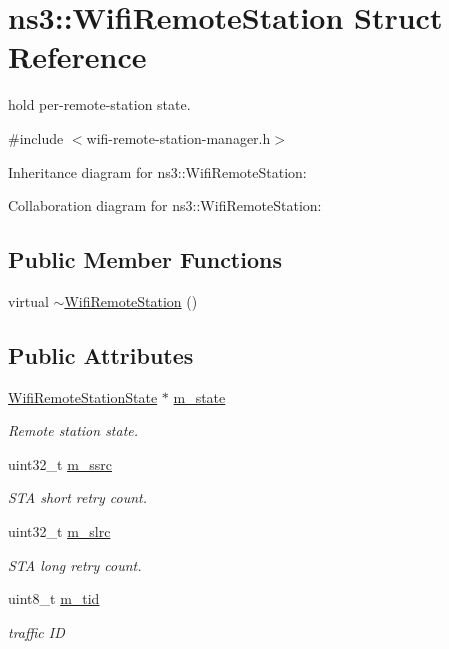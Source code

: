 \hypertarget{structns3_1_1WifiRemoteStation}{}\section{ns3\+:\+:Wifi\+Remote\+Station Struct Reference}
\label{structns3_1_1WifiRemoteStation}


hold per-\/remote-\/station state.  




{\ttfamily \#include $<$wifi-\/remote-\/station-\/manager.\+h$>$}



Inheritance diagram for ns3\+:\+:Wifi\+Remote\+Station\+:


Collaboration diagram for ns3\+:\+:Wifi\+Remote\+Station\+:
\subsection*{Public Member Functions}
\begin{DoxyCompactItemize}
\item 
virtual \hyperlink{structns3_1_1WifiRemoteStation_aed0b1671b9912c38f1dad6d5bbd2d2a5}{$\sim$\+Wifi\+Remote\+Station} ()
\end{DoxyCompactItemize}
\subsection*{Public Attributes}
\begin{DoxyCompactItemize}
\item 
\hyperlink{structns3_1_1WifiRemoteStationState}{Wifi\+Remote\+Station\+State} $\ast$ \hyperlink{structns3_1_1WifiRemoteStation_a1be76bd4ea5bb25afcb4385f37ffa199}{m\+\_\+state}
\begin{DoxyCompactList}\small\item\em Remote station state. \end{DoxyCompactList}\item 
uint32\+\_\+t \hyperlink{structns3_1_1WifiRemoteStation_a027f8c8c1c40a437b455d3dcd97e4408}{m\+\_\+ssrc}
\begin{DoxyCompactList}\small\item\em S\+TA short retry count. \end{DoxyCompactList}\item 
uint32\+\_\+t \hyperlink{structns3_1_1WifiRemoteStation_a14524839f4f2bf27a5bb9b7585d034c3}{m\+\_\+slrc}
\begin{DoxyCompactList}\small\item\em S\+TA long retry count. \end{DoxyCompactList}\item 
uint8\+\_\+t \hyperlink{structns3_1_1WifiRemoteStation_a0f4afa7fd0d70e76458943b9f0b99561}{m\+\_\+tid}
\begin{DoxyCompactList}\small\item\em traffic ID \end{DoxyCompactList}\end{DoxyCompactItemize}


